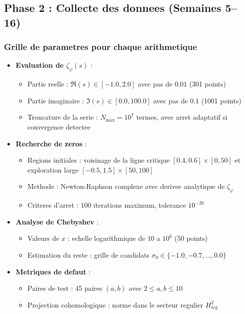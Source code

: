 \documentclass[11pt,a4paper]{article}
\begin{document}
	\subsection{Phase 2 : Collecte des donnees (Semaines 5--16)}
	
	\subsubsection{Grille de parametres pour chaque arithmetique}
	\begin{itemize}
		\item \textbf{Evaluation de $\zeta_\varphi(s)$} :
		\begin{itemize}
			\item Partie reelle : $\Re(s) \in [-1.0, 2.0]$ avec pas de $0.01$ (301 points)
			\item Partie imaginaire : $\Im(s) \in [0.0, 100.0]$ avec pas de $0.1$ (1001 points)
			\item Troncature de la serie : $N_{\max} = 10^7$ termes, avec arret adaptatif si convergence detectee
		\end{itemize}
		\item \textbf{Recherche de zeros} :
		\begin{itemize}
			\item Regions initiales : voisinage de la ligne critique $[0.4,0.6]\times[0,50]$ et exploration large $[-0.5,1.5]\times[50,100]$
			\item Methode : Newton-Raphson complexe avec derivee analytique de $\zeta_\varphi$
			\item Criteres d'arret : $100$ iterations maximum, tolerance $10^{-20}$
		\end{itemize}
		\item \textbf{Analyse de Chebyshev} :
		\begin{itemize}
			\item Valeurs de $x$ : echelle logarithmique de $10$ a $10^6$ (50 points)
			\item Estimation du reste : grille de candidats $\sigma_0 \in \{-1.0, -0.7, \dots, 0.0\}$
		\end{itemize}
		\item \textbf{Metriques de defaut} :
		\begin{itemize}
			\item Paires de test : 45 paires $(a,b)$ avec $2\leq a,b\leq 10$
			\item Projection cohomologique : norme dans le secteur regulier $H^2_{\mathrm{reg}}$
		\end{itemize}
	\end{itemize}
	
\end{document}
